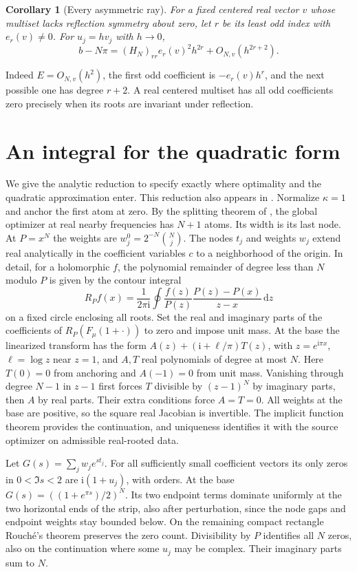 \documentclass[11pt]{article}
\newtheorem{corollary}[theorem]{Corollary}
\newcommand{\ii}{\mathrm i}
\newcommand{\dd}{\mathrm d}
\begin{document}
\begin{corollary}[Every asymmetric ray]\label{cor:ray}
For a fixed centered real vector $v$ whose multiset lacks reflection
symmetry about zero, let $r$ be its least odd index with $e_r(v)\ne0$.
For $u_j=hv_j$ with $h\to0$,
\[
 b-N\pi=(H_N)_{rr}e_r(v)^2h^{2r}+O_{N,v}(h^{2r+2}).
\]
\end{corollary}
Indeed $E=O_{N,v}(h^2)$, the first odd coefficient is $-e_r(v)h^r$,
and the next possible one has degree $r+2$. A real centered multiset
has all odd coefficients zero precisely when its roots are invariant
under reflection.

\section{An integral for the quadratic form}
We give the analytic reduction to specify exactly where optimality and
the quadratic approximation enter. This reduction also appears in
\cite{previous}. Normalize $\kappa=1$ and anchor the first
atom at zero. By the splitting theorem of \cite{repo}, the global
optimizer at real nearby frequencies has $N+1$ atoms. Its width is its
last node. At $P=x^N$ the weights are $w_j^0=2^{-N}\binom Nj$.
The nodes $t_j$ and weights $w_j$ extend real analytically in the
coefficient variables $c$ to a neighborhood of the origin. In detail,
for a holomorphic $f$, the polynomial remainder of degree less than $N$
modulo $P$ is given by the contour integral
\[
 R_Pf(x)=\frac1{2\pi\ii}\oint
 \frac{f(z)}{P(z)}\frac{P(z)-P(x)}{z-x}\,\dd z
\]
on a fixed circle enclosing all roots. Set the real and imaginary parts
of the coefficients of $R_P(F_\mu(1+\cdot))$ to zero and impose unit
mass. At the base the linearized transform has the form
$A(z)+(\ii+\ell/\pi)T(z)$, with $z=e^{\ii\pi x}$,
$\ell=\log z$ near $z=1$, and $A,T$ real polynomials of degree at
most $N$. Here $T(0)=0$ from anchoring and $A(-1)=0$ from unit mass.
Vanishing through degree $N-1$ in $z-1$ first forces $T$ divisible
by $(z-1)^N$ by imaginary parts, then $A$ by real parts. Their extra
conditions force $A=T=0$. All weights at the base are positive, so the
square real Jacobian is invertible. The implicit function theorem
provides the continuation, and uniqueness identifies it with the
source optimizer on admissible real-rooted data.

Let $G(s)=\sum_j w_j e^{s t_j}$. For all sufficiently small
coefficient vectors its only zeros in $0<\Im s<2$ are
$\ii(1+u_j)$, with orders. At the base $G(s)=((1+e^{\pi s})/2)^N$.
Its two endpoint terms dominate uniformly at the two horizontal ends of
the strip, also after perturbation, since the node gaps and endpoint
weights stay bounded below. On the remaining compact rectangle Rouch\'e's
theorem preserves the zero count. Divisibility by $P$ identifies all
$N$ zeros, also on the continuation where some $u_j$ may be complex.
Their imaginary parts sum to $N$.
\end{document}

